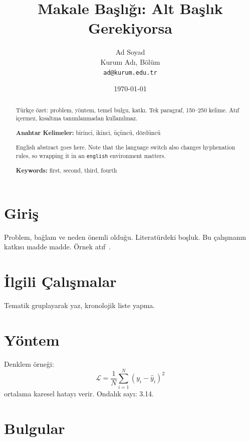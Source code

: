 \documentclass[12pt,a4paper]{article}
\title{Makale Başlığı: Alt Başlık Gerekiyorsa}
\author{Ad Soyad\\ \small Kurum Adı, Bölüm \\ \small \texttt{ad@kurum.edu.tr}}
\date{\today}
\begin{document}
\maketitle

\begin{abstract}
\noindent Türkçe özet: problem, yöntem, temel bulgu, katkı. Tek paragraf, 150--250 kelime.
Atıf içermez, kısaltma tanımlanmadan kullanılmaz.

\vspace{4pt}
\noindent\textbf{Anahtar Kelimeler:} birinci, ikinci, üçüncü, dördüncü
\end{abstract}

\begin{english}
\begin{abstract}
\noindent English abstract goes here. Note that the language switch also changes
hyphenation rules, so wrapping it in an \texttt{english} environment matters.

\vspace{4pt}
\noindent\textbf{Keywords:} first, second, third, fourth
\end{abstract}
\end{english}

\section{Giriş}
\label{sec:giris}
Problem, bağlam ve neden önemli olduğu. Literatürdeki boşluk. Bu çalışmanın katkısı
madde madde. Örnek atıf~\cite{ornek2024}.

\section{İlgili Çalışmalar}
\label{sec:ilgili}
Tematik gruplayarak yaz, kronolojik liste yapma.

\section{Yöntem}
\label{sec:yontem}
Denklem örneği:
\begin{equation}
  \label{eq:kayip}
  \mathcal{L} = \frac{1}{N}\sum_{i=1}^{N}\left(y_i - \hat{y}_i\right)^2
\end{equation}
 ortalama karesel hatayı verir. Ondalık sayı: \num{3,14}.

\section{Bulgular}
\label{sec:bulgular}
\end{document}

